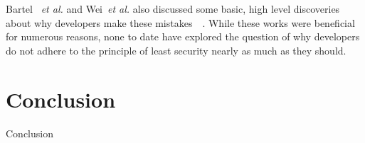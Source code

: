 \documentclass{sig-alternate}
\begin{document}
Bartel ~\emph{et al.} and Wei~\emph{et al.} also discussed some basic, high level discoveries about why developers make these mistakes~\cite{Bartel:2012:ASP:2351676.2351722}~\cite{Wei:2012:PEA:2420950.2420956}. While these works were beneficial for numerous reasons, none to date have explored the question of why developers do not adhere to the principle of least security nearly as much as they should.





\section{Conclusion}
\label{sec: conclusion}
Conclusion




 

\end{document}
